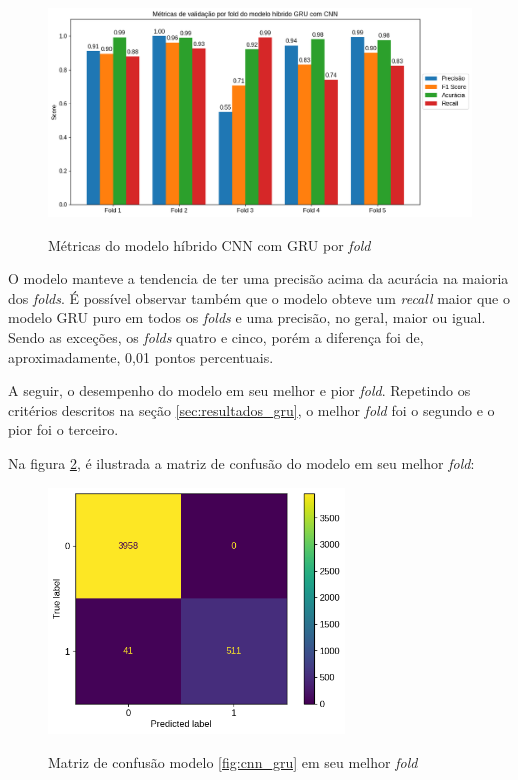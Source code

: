 \begin{figure}[H]
  \centering
  \caption{Métricas do modelo híbrido CNN com GRU por \textit{fold}}
   \includegraphics[width=1.0\textwidth]{figuras/modelos_resultados/gru_cnn/gru_cnn_metricas_por_fold.png} 
  \label{fig:gru_cnn_resultados_por_fold}
\end{figure}

O modelo manteve a tendencia de ter uma precisão acima da acurácia na maioria dos \textit{folds}. É possível observar também que o modelo
obteve um \textit{recall} maior que o modelo GRU puro em todos os \textit{folds} e uma precisão, no geral, maior ou igual. Sendo as exceções,
os \textit{folds} quatro e cinco, porém a diferença foi de, aproximadamente, 0,01 pontos percentuais. 

A seguir, o desempenho do modelo em seu melhor e pior \textit{fold}. Repetindo os critérios descritos na seção \ref{sec:resultados_gru}, o melhor
\textit{fold} foi o segundo e o pior foi o terceiro.

Na figura \ref{fig:matriz_confusao_cnn_gru_melhor_fold}, é ilustrada a matriz de confusão do modelo em seu melhor \textit{fold}:

\begin{figure}[H]
  \centering
  \caption{Matriz de confusão modelo \ref{fig:cnn_gru} em seu melhor \textit{fold}}
   \includegraphics[width=0.7\textwidth]{figuras/modelos_resultados/gru_cnn/matriz_confusao_melhor_fold_gru_cnn_1_alt.png} 
  \label{fig:matriz_confusao_cnn_gru_melhor_fold}
\end{figure}

